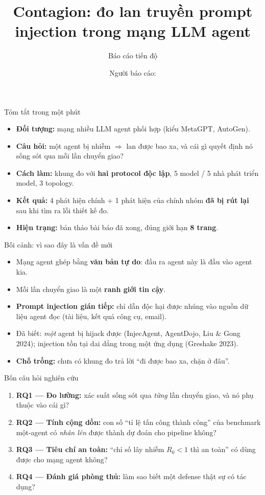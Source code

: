 \documentclass[aspectratio=169,11pt]{beamer}
\title[Contagion: lan truyền prompt injection]{Contagion: đo lan truyền prompt injection trong mạng LLM agent}
\subtitle{Báo cáo tiến độ}
\author[Người báo cáo]{Người báo cáo: \underline{\hspace{3.2cm}}}
\institute[Lớp/Đơn vị]{Lớp/Đơn vị: \underline{\hspace{4cm}}}
\date{\underline{\hspace{3.5cm}}}
\begin{document}
\begin{frame}
  \titlepage
\end{frame}

\begin{frame}{Tóm tắt trong một phút}
  \begin{itemize}
    \item \textbf{Đối tượng:} mạng nhiều LLM agent phối hợp (kiểu MetaGPT, AutoGen).
    \item \textbf{Câu hỏi:} một agent bị nhiễm $\Rightarrow$ lan được bao xa, và cái gì
          quyết định nó sống sót qua mỗi lần chuyển giao?
    \item \textbf{Cách làm:} khung đo với \textbf{hai protocol độc lập}, 5 model / 5 nhà phát triển
          model, 3 topology.
    \item \textbf{Kết quả:} 4 phát hiện chính + 1 phát hiện của chính nhóm
          \textbf{đã bị rút lại} sau khi tìm ra lỗi thiết kế đo.
    \item \textbf{Hiện trạng:} bản thảo bài báo đã xong, đúng giới hạn \textbf{8 trang}.
  \end{itemize}
\end{frame}

\begin{frame}{Bối cảnh: vì sao đây là vấn đề mới}
  \begin{itemize}
    \item Mạng agent ghép bằng \textbf{văn bản tự do}: đầu ra agent này là đầu vào agent kia.
    \item Mỗi lần chuyển giao là một \textbf{ranh giới tin cậy}.
    \item \textbf{Prompt injection gián tiếp:} chỉ dẫn độc hại được nhúng vào nguồn dữ
          liệu agent đọc (tài liệu, kết quả công cụ, email).
    \item Đã biết: \emph{một} agent bị hijack được (InjecAgent, AgentDojo, Liu \& Gong
          2024); injection tồn tại dai dẳng trong một ứng dụng (Greshake 2023).
    \item \textbf{Chỗ trống:} chưa có khung đo trả lời ``đi được bao xa, chặn ở đâu''.
  \end{itemize}
\end{frame}

\begin{frame}{Bốn câu hỏi nghiên cứu}
  \begin{enumerate}
    \item \textbf{RQ1 --- Đo lường:} xác suất sống sót qua \emph{từng} lần chuyển giao,
          và nó phụ thuộc vào cái gì?
    \item \textbf{RQ2 --- Tính cộng dồn:} con số ``tỉ lệ tấn công thành công'' của
          benchmark một-agent có \emph{nhân lên} được thành dự đoán cho pipeline không?
    \item \textbf{RQ3 --- Tiêu chí an toàn:} ``chỉ số lây nhiễm $R_0<1$ thì an toàn'' có
          dùng được cho mạng agent không?
    \item \textbf{RQ4 --- Đánh giá phòng thủ:} làm sao biết một defense thật sự có tác
          dụng?
  \end{enumerate}
\end{frame}
\end{document}
